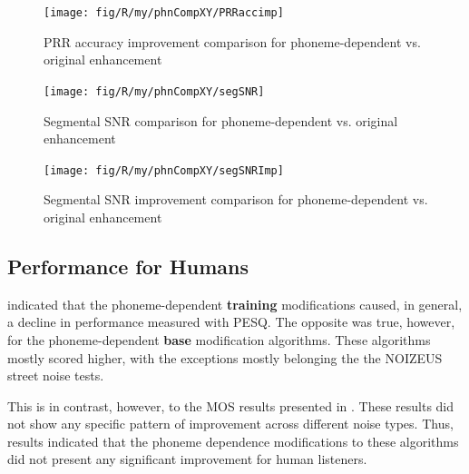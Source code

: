 \begin{figure}[H]
\noindent \begin{centering}
\texttt{[image: fig/R/my/phnCompXY/PRRaccimp]}
\par\end{centering}

\protect\caption{\label{fig:prraccimp-comparison-phn}\acs{PRR} accuracy improvement
comparison for phoneme-dependent vs. original enhancement}
\end{figure}


\begin{figure}[H]
\noindent \begin{centering}
\texttt{[image: fig/R/my/phnCompXY/segSNR]}
\par\end{centering}

\protect\caption{\label{fig:segsnr-comparison-phn}Segmental \acs{SNR} comparison
for phoneme-dependent vs. original enhancement}
\end{figure}


\begin{figure}[H]
\noindent \begin{centering}
\texttt{[image: fig/R/my/phnCompXY/segSNRImp]}
\par\end{centering}

\protect\caption{\label{fig:segsnrimp-comparison-phn}Segmental \acs{SNR} improvement
comparison for phoneme-dependent vs. original enhancement}
\end{figure}



\subsection{Performance for Humans}

 indicated that the phoneme-dependent
\textbf{training} modifications caused, in general, a decline in performance
measured with \ac{PESQ}. The opposite was true, however, for the
phoneme-dependent \textbf{base} modification algorithms. These algorithms
mostly scored higher, with the exceptions mostly belonging the the
NOIZEUS street noise tests.

This is in contrast, however, to the \ac{MOS} results presented in
.
These results did not show any specific pattern of improvement across
different noise types. Thus, results indicated that the phoneme dependence
modifications to these algorithms did not present any significant
improvement for human listeners.


